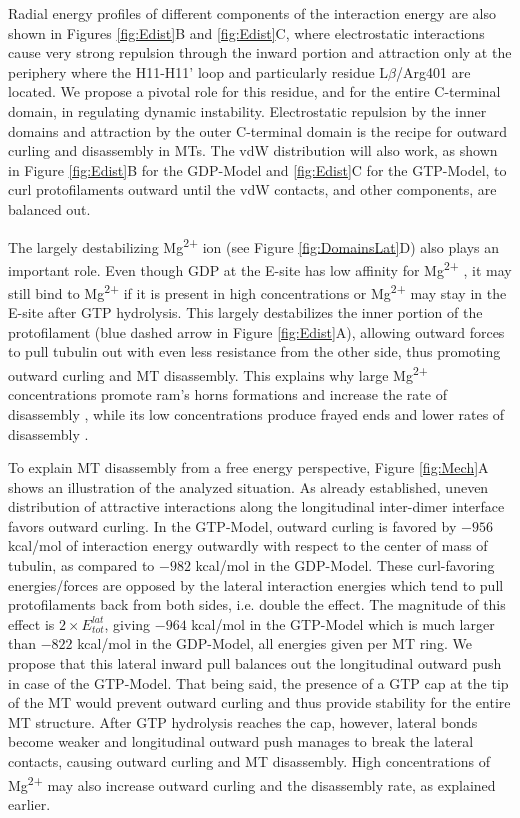 \documentclass[11pt]{report}
\begin{document}
Radial energy profiles
of different components of the interaction
energy are also shown in Figures 
\ref{fig:Edist}B and \ref{fig:Edist}C, where electrostatic
interactions cause very strong repulsion 
through the inward portion and attraction
only at the periphery where the H11-H11' loop and 
particularly residue L$\beta$/Arg401
are located. We propose
a pivotal role for this residue, and for
the entire C-terminal domain, in regulating
dynamic instability. Electrostatic repulsion 
by the inner domains
and attraction by the outer C-terminal
domain is the recipe 
for outward curling and
disassembly in MTs. The vdW distribution will also work, as shown in Figure \ref{fig:Edist}B for the GDP-Model and \ref{fig:Edist}C for the GTP-Model, to curl protofilaments
outward until the vdW contacts, and other components, are balanced out.

The largely destabilizing Mg\textsuperscript{2+} ion
(see Figure \ref{fig:DomainsLat}D) also plays an
important role. Even though
GDP at the E-site has low affinity for
Mg\textsuperscript{2+} \cite{Correia1987}, it
may still bind to Mg\textsuperscript{2+} if it is 
present in high concentrations
or Mg\textsuperscript{2+} may stay in the E-site after GTP hydrolysis. This largely destabilizes
the inner portion of the protofilament (blue
dashed arrow in Figure \ref{fig:Edist}A), allowing outward forces
to pull tubulin out with even less
resistance from the other side,
thus 
promoting outward curling and MT disassembly. This explains 
why large Mg\textsuperscript{2+} concentrations promote ram's horns 
formations \cite{Frigon1975} and increase the rate of disassembly \cite{Gal1988,Brien1990}, while its
low concentrations produce frayed ends and 
lower rates of disassembly \cite{Mandelkow1991}.

To explain MT disassembly from a free energy perspective,
Figure \ref{fig:Mech}A shows an illustration of the analyzed situation.
As already established, uneven distribution of attractive
interactions along the longitudinal inter-dimer interface favors outward curling. In the GTP-Model, outward curling is favored
by $-956$ kcal/mol of interaction energy outwardly with respect to the
center of mass of tubulin,
as compared to $-982$ kcal/mol in the GDP-Model.
These curl-favoring energies/forces are opposed by 
the lateral interaction energies which tend to pull
protofilaments back from both sides, i.e. double 
the effect. The magnitude of this 
effect is $2 \times E_{tot}^{lat}$, giving $-964$ kcal/mol in
the GTP-Model which is much larger than  $-822$ kcal/mol in the GDP-Model,
all energies given per MT ring.
We propose that this lateral inward pull
balances out the longitudinal
outward push in case of the GTP-Model.
That being said, the presence of a GTP
cap at the tip of the MT would prevent
outward curling and thus provide
stability for the entire MT structure.
After GTP hydrolysis reaches the cap, however,
lateral bonds become weaker
and longitudinal outward push manages
to break the lateral contacts, causing
outward curling and MT disassembly.
High concentrations of Mg\textsuperscript{2+} may also increase outward curling and the disassembly rate, as explained
earlier.
\end{document}
